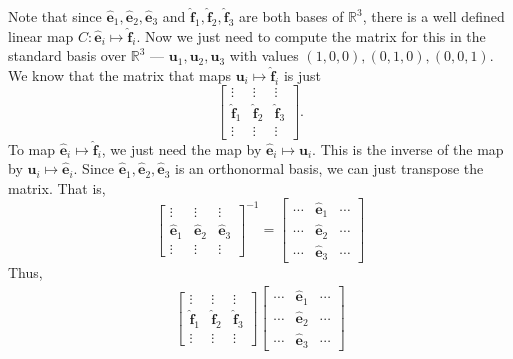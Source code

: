 \documentclass[12 pt, letterpaper]{hmcpset}
\begin{document}
\begin{solution}
	Note that since $\hat{\mathbf{e}}_{1}, \hat{\mathbf{e}}_{2}, \hat{\mathbf{e}}_{3}$ and $\hat{\mathbf{f}}_{1}, \hat{\mathbf{f}}_{2}, \hat{\mathbf{f}}_{3}$ are both bases of $\mathbb{R}^{3}$, there is a well defined linear map $C : \hat{\mathbf{e}}_{i} \mapsto \hat{\mathbf{f}}_{i}$. Now we just need to compute the matrix for this in the standard basis over $\mathbb{R}^{3}$ --- $\mathbf{u}_{1}, \mathbf{u}_{2}, \mathbf{u}_{3}$ with values $(1, 0, 0), (0, 1, 0), (0, 0, 1)$.
	We know that the matrix that maps $\mathbf{u}_{i} \mapsto \hat{\mathbf{f}}_{i}$ is just
	\[
		\begin{bmatrix}
			\vdots & \vdots & \vdots \\
			\hat{\mathbf{f}}_{1} & \hat{\mathbf{f}}_{2} & \hat{\mathbf{f}}_{3} \\
			\vdots & \vdots & \vdots
		\end{bmatrix}.
	\]
	To map $\hat{\mathbf{e}}_{i} \mapsto \hat{\mathbf{f}}_{i}$, we just need the map by $\hat{\mathbf{e}}_{i} \mapsto \mathbf{u}_{i}$. This is the inverse of the map by $\mathbf{u}_{i} \mapsto \hat{\mathbf{e}}_{i}$. Since $\hat{\mathbf{e}}_{1}, \hat{\mathbf{e}}_{2}, \hat{\mathbf{e}}_{3}$ is an orthonormal basis, we can just transpose the matrix. That is,
	\[
		\begin{bmatrix}
			\vdots & \vdots & \vdots \\
			\hat{\mathbf{e}}_{1} & \hat{\mathbf{e}}_{2} & \hat{\mathbf{e}}_{3} \\
			\vdots & \vdots & \vdots
		\end{bmatrix}^{-1} = 
		\begin{bmatrix}
			\cdots & \hat{\mathbf{e}}_{1} & \cdots \\
			\cdots & \hat{\mathbf{e}}_{2} & \cdots \\
			\cdots & \hat{\mathbf{e}}_{3} & \cdots
		\end{bmatrix}
	\]
	Thus,
	\[
		\begin{split}
			\begin{bmatrix}
				\vdots & \vdots & \vdots \\
				\hat{\mathbf{f}}_{1} & \hat{\mathbf{f}}_{2} & \hat{\mathbf{f}}_{3} \\
					\vdots & \vdots & \vdots
			\end{bmatrix}
			\begin{bmatrix}
				\cdots & \hat{\mathbf{e}}_{1} & \cdots \\
				\cdots & \hat{\mathbf{e}}_{2} & \cdots \\
				\cdots & \hat{\mathbf{e}}_{3} & \cdots
			\end{bmatrix}

\end{split}\]
\end{solution}
\end{document}
